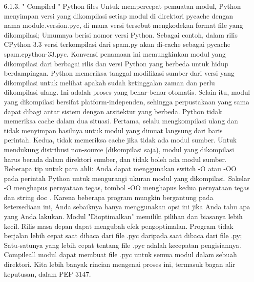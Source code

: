 6.1.3.   " Compiled  "  Python files  
Untuk mempercepat pemuatan modul, Python menyimpan versi yang dikompilasi setiap modul di direktori  pycache    dengan nama module.version.pyc, di mana versi tersebut mengkodekan format file yang dikompilasi; Umumnya berisi nomor versi Python. Sebagai contoh, dalam rilis CPython 3.3 versi terkompilasi dari spam.py akan di-cache sebagai  pycache   spam.cpython-33.pyc. Konvensi penamaan ini memungkinkan modul yang dikompilasi dari berbagai rilis dan versi Python yang berbeda untuk hidup berdampingan.  
Python memeriksa tanggal modifikasi sumber dari versi yang dikompilasi untuk melihat apakah sudah ketinggalan zaman dan perlu dikompilasi ulang. Ini adalah proses yang benar-benar otomatis. Selain itu, modul yang dikompilasi bersifat platform-independen, sehingga perpustakaan yang sama dapat dibagi antar sistem dengan arsitektur yang berbeda. Python tidak memeriksa cache dalam dua situasi. Pertama, selalu mengkompilasi ulang dan tidak menyimpan hasilnya untuk modul yang dimuat langsung dari baris perintah. Kedua, tidak memeriksa cache jika tidak ada modul sumber. Untuk mendukung distribusi non-source (dikompilasi saja), modul yang dikompilasi harus berada dalam direktori sumber, dan tidak boleh ada modul sumber. 
Beberapa tip untuk para ahli:  
 Anda dapat menggunakan switch -O atau -OO pada perintah Python untuk mengurangi ukuran modul yang dikompilasi. Sakelar -O menghapus pernyataan tegas, tombol -OO menghapus kedua pernyataan tegas dan string doc  . Karena beberapa program mungkin bergantung pada ketersediaan ini, Anda sebaiknya hanya menggunakan opsi ini jika Anda tahu apa yang Anda lakukan. Modul "Dioptimalkan" memiliki pilihan dan biasanya lebih kecil. Rilis masa depan dapat mengubah efek pengoptimalan. 
  Program tidak berjalan lebih cepat saat dibaca dari file .pyc daripada saat dibaca dari file .py; Satu-satunya yang lebih cepat tentang file .pyc adalah kecepatan pengisiannya.  
  Compileall modul dapat membuat file .pyc untuk semua modul dalam sebuah direktori.  
  Kita lebih banyak rincian mengenai proses ini, termasuk bagan alir keputusan, dalam PEP 3147. 


